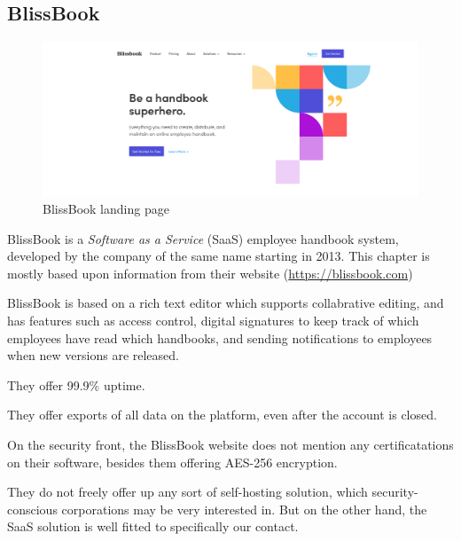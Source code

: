\subsection{BlissBook}
\begin{figure}[h]
	\includegraphics[width=1\textwidth]{billeder/BlissBooks.png}
	\caption{BlissBook landing page}
\end{figure}
BlissBook is a \textit{Software as a Service} (SaaS) employee handbook system, developed by the company of the same name starting in 2013. %
This chapter is mostly based upon information from their website (\url{https://blissbook.com})


BlissBook is based on a rich text editor which supports collabrative editing, and has features such as access control, digital signatures to keep track of which employees have read which handbooks, and sending notifications to employees when new versions are released.

They offer 99.9\% uptime.

They offer exports of all data on the platform, even after the account is closed.

On the security front, the BlissBook website does not mention any certificatations on their software, besides them offering AES-256 encryption. %

They do not freely offer up any sort of self-hosting solution, which security-conscious corporations may be very interested in. But on the other hand, the SaaS solution is well fitted to specifically our contact.
